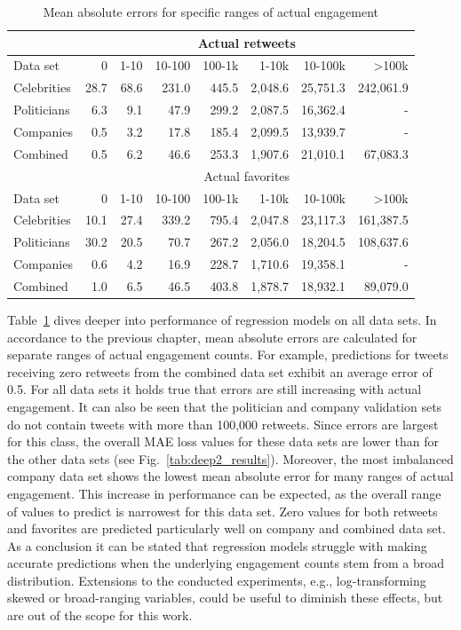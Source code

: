 \begin{table}
  \begin{tabular}{lrrrrrrr}
    \toprule
    & \multicolumn{7}{c}{Actual retweets} \\
    \midrule
    Data set & 0 & 1-10 & 10-100 & 100-1k & 1-10k & 10-100k & >100k \\
    \midrule
    Celebrities & 28.7 & 68.6 & 231.0 & 445.5 & 2,048.6 & 25,751.3 & 242,061.9 \\
    Politicians & 6.3 & 9.1 & 47.9 & 299.2 & 2,087.5 & 16,362.4 & - \\
    Companies & 0.5 & 3.2 & 17.8 & 185.4 & 2,099.5 & 13,939.7 & - \\
    Combined & 0.5 & 6.2 & 46.6 & 253.3 & 1,907.6 & 21,010.1 & 67,083.3 \\
    \bottomrule
    \toprule
    & \multicolumn{7}{c}{Actual favorites} \\
    \midrule
    Data set & 0 & 1-10 & 10-100 & 100-1k & 1-10k & 10-100k & >100k \\
    \midrule
    Celebrities & 10.1 & 27.4 & 339.2 & 795.4 & 2,047.8 & 23,117.3 & 161,387.5 \\
    Politicians & 30.2 & 20.5 & 70.7 & 267.2 & 2,056.0 & 18,204.5 & 108,637.6 \\
    Companies & 0.6 & 4.2 & 16.9 & 228.7 & 1,710.6 & 19,358.1 & - \\
    Combined & 1.0 & 6.5 & 46.5 & 403.8 & 1,878.7 & 18,932.1 & 89,079.0 \\
    \bottomrule
  \end{tabular}
  \caption[Detailed regression results for multi-input deep neural networks]{Mean absolute errors for specific ranges of actual engagement}
  \label{tab:d1_regression_eval}
\end{table}

Table~\ref{tab:d1_regression_eval} dives deeper into performance of regression
models on all data sets.
In accordance to the previous chapter, mean absolute errors are calculated for
separate ranges of actual engagement counts.
For example, predictions for tweets receiving zero retweets from the combined data set
exhibit an average error of 0.5.
For all data sets it holds true that errors are still increasing with actual
engagement.
It can also be seen that the politician and company validation sets do not contain tweets
with more than 100,000 retweets.
Since errors are largest for this class, the overall MAE loss values for these
data sets are lower than for the other data sets (see Fig.~\ref{tab:deep2_results}).
Moreover, the most imbalanced company data set shows the lowest mean absolute error
for many ranges of actual engagement.
This increase in performance can be expected, as the overall range of values to
predict is narrowest for this data set.
Zero values for both retweets and favorites are predicted particularly well on 
company and combined data set.
As a conclusion it can be stated that regression models struggle with making
accurate predictions when the underlying engagement counts stem from a broad
distribution.
Extensions to the conducted experiments, e.g., log-transforming skewed or broad-ranging
variables, could be useful to diminish these effects, but are out of the scope
for this work.
